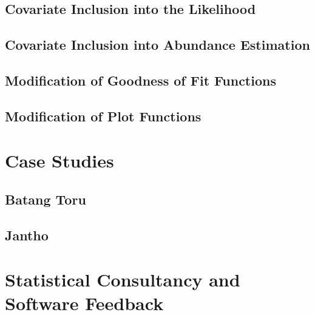 \documentclass[11pt]{article}
\begin{document}
\begin{multicols}{2}
\subsection{Covariate Inclusion into the Likelihood}
\subsection{Covariate Inclusion into Abundance Estimation}
\subsection{Modification of Goodness of Fit Functions}
\subsection{Modification of Plot Functions}

\section{Case Studies}
\subsection{Batang Toru}
\subsection{Jantho}

\section{Statistical Consultancy and Software Feedback}

\end{multicols}	
\end{document}
